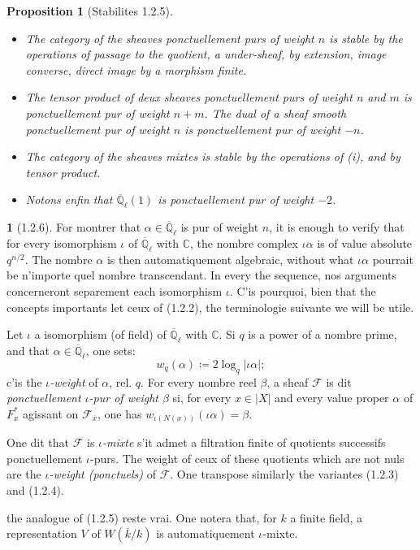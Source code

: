 \documentclass[12pt,a4paper]{article}
\theoremstyle{plain}
\newtheorem{proposition}[theorem]{Proposition}
\theoremstyle{definition}
\theoremstyle{definition}
\newtheorem{para}{}[section]
\theoremstyle{remark}
\begin{document}
\begin{proposition}[Stabilites 1.2.5]
$\;$
\begin{itemize}[nosep]
\item[(i)] The category of the sheaves ponctuellement purs of weight $n$ is stable by the operations of passage to the quotient, a under-sheaf, by extension, image converse, direct image by a morphism finite.
\item[(ii)] The tensor product of deux sheaves ponctuellement purs of weight $n$ and $m$ is ponctuellement pur of weight $n+m$. The dual of a sheaf smooth ponctuellement pur of weight $n$ is ponctuellement pur of weight $-n$.
\item[(iii)] The category of the sheaves mixtes is stable by the operations of (i), and by tensor product.
\item[(iv)] Notons enfin that $\overline{\mathbb{Q}}_\ell(1)$ is ponctuellement pur of weight $-2$.
\end{itemize}
\end{proposition}

\begin{para}[1.2.6]
For montrer that $\alpha \in \overline{\mathbb{Q}}_\ell$ is pur of weight $n$, it is enough to verify that for every isomorphism $\iota$ of $\overline{\mathbb{Q}}_\ell$ with $\mathbb{C}$, the nombre complex $\iota\alpha$ is of value absolute $q^{n/2}$. The nombre $\alpha$ is then automatiquement algebraic, without what $\iota\alpha$ pourrait be n'importe quel nombre transcendant. In every the sequence, nos arguments concerneront separement each isomorphism $\iota$. C'is pourquoi, bien that the concepts importants let ceux of (1.2.2), the terminologie suivante we will be utile.

Let $\iota$ a isomorphism (of field) of $\overline{\mathbb{Q}}_\ell$ with $\mathbb{C}$. Si $q$ is a power of a nombre prime, and that $\alpha \in \overline{\mathbb{Q}}_\ell$, one sets:
\begin{equation}\tag{1.2.6.1}
w_q(\alpha) \coloneqq 2 \log_q |\iota\alpha|;
\end{equation}
c'is the \emph{$\iota$-weight} of $\alpha$, rel. $q$. For every nombre reel $\beta$, a sheaf $\mathscr{F}$ is dit \emph{ponctuellement $\iota$-pur of weight $\beta$} si, for every $x \in |X|$ and every value proper $\alpha$ of $F_x^*$ agissant on $\mathscr{F}_{\overline{x}}$, one has $w_{\iota(N(x))}(\iota\alpha) = \beta$.

One dit that $\mathscr{F}$ is \emph{$\iota$-mixte} s'it admet a filtration finite of quotients successifs ponctuellement $\iota$-purs. The weight of ceux of these quotients which are not nuls are the \emph{$\iota$-weight (ponctuels)} of $\mathscr{F}$. One transpose similarly the variantes (1.2.3) and (1.2.4).

the analogue of (1.2.5) reste vrai. One notera that, for $k$ a finite field, a representation $V$ of $W(\overline{k}/k)$ is automatiquement $\iota$-mixte.
\end{para}
\end{document}
